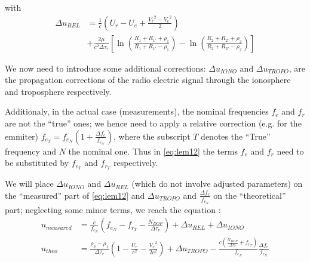 with
\begin{equation}
    \begin{split}
        \Delta u_{REL} &= \frac{1}{c} (U_r - U_e + \frac{{V_r}^2 - {V_e}^2}{2}) \\
        & + \frac{2 \mu}{c^2 \Delta\tau_r} [\ln{(\frac{R_1 + R_{1'} + \rho_1}{R_1 + R_{1'} - \rho_1})} - \ln{(\frac{R_2 + R_{2'} + \rho_2}{R_2 + R_{2'} - \rho_2})}]
    \end{split}
\end{equation}

We now need to introduce some additional corrections:
\(\Delta u_{IONO}\) and \(\Delta u_{TROPO}\), are the propagation corrections of 
the radio electric signal through the ionosphere and troposphere respectively. 

Additionaly, in the actual case (measurements), the nominal frequencies \(f_e\) and \(f_r\) 
are not the ``true'' ones; we hence need to apply a relative correction (e.g. for the 
emmiter) \(f_{e_T} = f_{e_N} (1 + \frac{\Delta f_e}{f_{e_N}})\), where the subscript \(T\) 
denotes the ``True'' frequency and \(N\) the nominal one. Thus in \ref{eq:lem12} the 
terms \(f_e\) and \(f_r\) need to be substituted by \(f_{e_T}\) and \(f_{r_T}\) respectively.

We will place \(\Delta u_{IONO}\) and \(\Delta u_{REL}\) (which do not involve adjusted parameters) 
on the ``measured'' part of \ref{eq:lem12} and \(\Delta u_{TROPO}\) and \(\frac{\Delta f_e}{f_{e_N}}\) 
on the ``theoretical'' part; neglecting some minor terms, we reach the equation \cite{lemoine-2016}:
\begin{subequations} \label{eq:lem13}
    \begin{align}
        u_{measured} & = \frac{c}{f_{e_N}} (f_{e_N} - f_{r_T} -
          \frac{N_{DOP}}{\Delta\tau_r}) + \Delta u_{REL} + 
          \Delta u_{IONO} \label{eq:lem13a} \\
        u_{theo} &= \frac{\rho_2 - \rho_1}{\Delta\tau_r} 
          (1- \frac{U_e}{c^2} - \frac{{V_e}^2}{2 c^2}) + 
          \Delta u_{TROPO} - \frac{c(\frac{N_{DOP}}{\Delta\tau_r} + 
          f_{r_T})}{f_{e_N}} \frac{\Delta f_e}{f_{e_N}} \label{eq:lem13b}
    \end{align}
\end{subequations}

